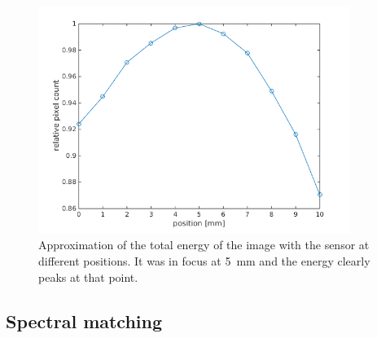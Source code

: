 \documentclass[a4paper, 12pt]{paper}
\begin{document}
\begin{figure}[H]
    \centering
    \includegraphics[width=0.9\textwidth]{img/pixel_count_position}
    \caption{Approximation of the total energy of the image with the sensor at different positions. It was in focus at \SI{5}{\milli\meter} and the energy clearly peaks at that point.}
\label{fig:pixel_count}
\end{figure}

\subsection{Spectral matching}
\end{document}
